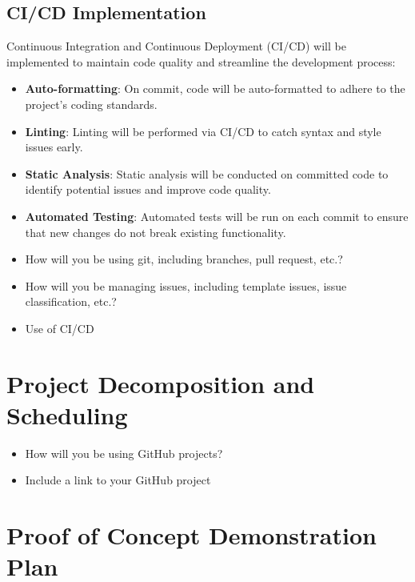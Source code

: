 \documentclass{article}
\begin{document}
\subsection{CI/CD Implementation}
Continuous Integration and Continuous Deployment (CI/CD) will be implemented to maintain code quality and streamline the development process:
\begin{itemize}
    \item \textbf{Auto-formatting}: On commit, code will be auto-formatted to adhere to the project's coding standards.
    \item \textbf{Linting}: Linting will be performed via CI/CD to catch syntax and style issues early.
    \item \textbf{Static Analysis}: Static analysis will be conducted on committed code to identify potential issues and improve code quality.
    \item \textbf{Automated Testing}: Automated tests will be run on each commit to ensure that new changes do not break existing functionality.
\end{itemize}

\begin{itemize}
	\item How will you be using git, including branches, pull request, etc.?
	\item How will you be managing issues, including template issues, issue
	classification, etc.?
  \item Use of CI/CD
\end{itemize}

\section{Project Decomposition and Scheduling}

\begin{itemize}
  \item How will you be using GitHub projects?
  \item Include a link to your GitHub project
\end{itemize}


\section{Proof of Concept Demonstration Plan}
\end{document}
